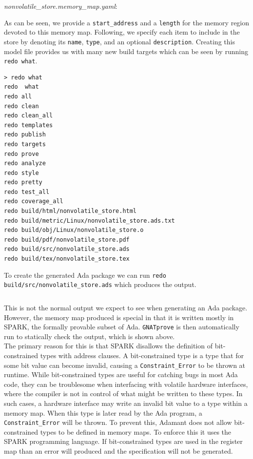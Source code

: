 \textit{nonvolatile\_store.memory\_map.yaml}:

As can be seen, we provide a \texttt{start\_address} and a \texttt{length} for the memory region devoted to this memory map. Following, we specify each item to include in the store by denoting its \texttt{name}, \texttt{type}, and an optional \texttt{description}. Creating this model file provides us with many new build targets which can be seen by running \texttt{redo what}.

\vspace{5mm} %
\begin{verbatim}
> redo what
redo  what
redo all
redo clean
redo clean_all
redo templates
redo publish
redo targets
redo prove
redo analyze
redo style
redo pretty
redo test_all
redo coverage_all
redo build/html/nonvolatile_store.html
redo build/metric/Linux/nonvolatile_store.ads.txt
redo build/obj/Linux/nonvolatile_store.o
redo build/pdf/nonvolatile_store.pdf
redo build/src/nonvolatile_store.ads
redo build/tex/nonvolatile_store.tex
\end{verbatim}
\vspace{5mm} %

To create the generated Ada package we can run \texttt{redo build/src/nonvolatile\_store.ads} which produces the output.

\vspace{5mm} %
\inputminted{text}{../example_architecture/memory_map/output.txt}
\vspace{5mm} %

This is not the normal output we expect to see when generating an Ada package. However, the memory map produced is special in that it is written mostly in SPARK, the formally provable subset of Ada. \texttt{GNATprove} is then automatically run to statically check the output, which is shown above. \\

The primary reason for this is that SPARK disallows the definition of bit-constrained types with address clauses. A bit-constrained type is a type that for some bit value can become invalid, causing a \texttt{Constraint\_Error} to be thrown at runtime. While bit-constrained types are useful for catching bugs in most Ada code, they can be troublesome when interfacing with volatile hardware interfaces, where the compiler is not in control of what might be written to these types. In such cases, a hardware interface may write an invalid bit value to a type within a memory map. When this type is later read by the Ada program, a \texttt{Constraint\_Error} will be thrown. To prevent this, Adamant does not allow bit-constrained types to be defined in memory maps. To enforce this it uses the SPARK programming language. If bit-constrained types are used in the register map than an error will produced and the specification will not be generated. \\

